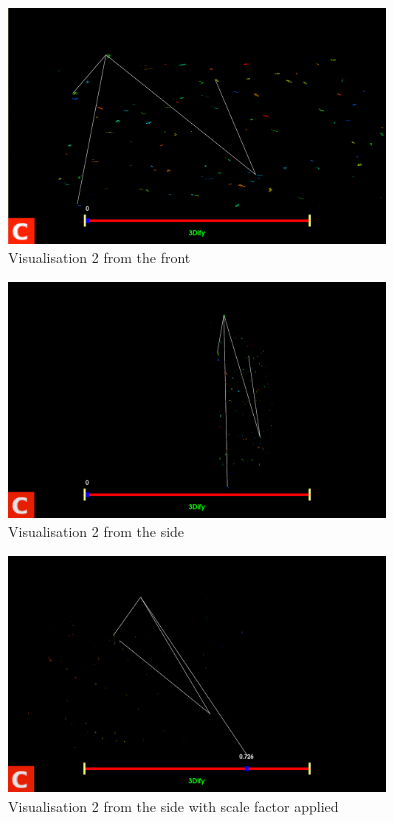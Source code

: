 \documentclass{article}
\begin{document}
\begin{figure}
	\centering
	\includegraphics[width=10cm]{2022-04-16-212350_1440x899_scrot.png}
	\caption{Visualisation 2 from the front}
	\label{fig:v2:front}
\end{figure}
\begin{figure}
	\centering
	\includegraphics[width=10cm]{2022-04-16-212359_1439x899_scrot.png}
	\caption{Visualisation 2 from the side}
	\label{fig:v2:side}
\end{figure}
\begin{figure}
	\centering
	\includegraphics[width=10cm]{2022-04-16-212411_1438x899_scrot.png}
	\caption{Visualisation 2 from the side with scale factor applied}
	\label{fig:v2:scale}
\end{figure}
\end{document}
